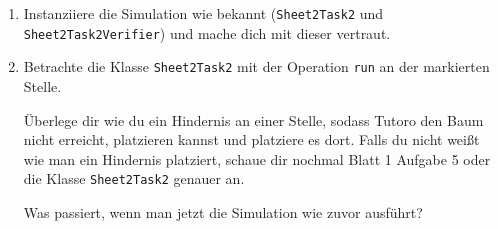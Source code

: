 

\begin{enumerate}
    \item Instanziiere die Simulation wie bekannt (\lstinline{Sheet2Task2} und \lstinline{Sheet2Task2Verifier}) und mache dich mit dieser vertraut.
    \item Betrachte die Klasse \lstinline{Sheet2Task2} mit der Operation \lstinline{run} an der markierten Stelle.

        Überlege dir wie du ein Hindernis an einer Stelle, sodass Tutoro den Baum nicht erreicht, platzieren kannst und platziere es dort. Falls du nicht weißt wie man ein Hindernis platziert, schaue dir nochmal Blatt 1 Aufgabe 5 oder die Klasse \lstinline{Sheet2Task2} genauer an.

        Was passiert, wenn man jetzt die Simulation wie zuvor ausführt?\\
        
\end{enumerate}

